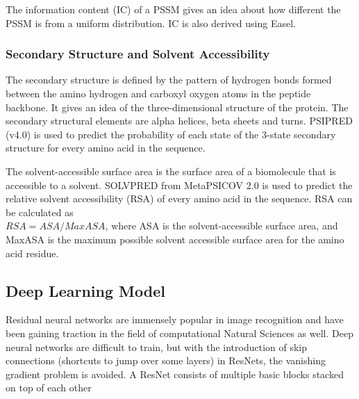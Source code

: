 \documentclass[journal=jacsat,manuscript=article]{achemso}
\begin{document}
The information content (IC) of a PSSM gives an idea about how different the PSSM is from a uniform distribution. IC is also derived using Easel.

\subsubsection{Secondary Structure and Solvent Accessibility}
\quad The secondary structure is defined by the pattern of hydrogen bonds formed between the amino hydrogen and carboxyl oxygen atoms in the peptide backbone. It gives an idea of the three-dimensional structure of the protein. The secondary structural elements are alpha helices, beta sheets and turns. PSIPRED (v4.0) \cite{jones1999protein} is used to predict the probability of each state of the 3-state secondary structure for every amino acid in the sequence.

The solvent-accessible surface area is the surface area of a biomolecule that is accessible to a solvent. SOLVPRED from MetaPSICOV 2.0\cite{jones2015metapsicov} is used to predict the relative solvent accessibility (RSA) of every amino acid in the sequence. RSA can be calculated as \\ ${RSA} = {ASA} / {MaxASA}$, where ASA is the solvent-accessible surface area, and MaxASA is the maximum possible solvent accessible surface area for the amino acid residue.





\subsection{Deep Learning Model}
\quad Residual neural networks \cite{he2016deep} are immensely popular in image recognition and have been gaining traction in the field of computational Natural Sciences as well. Deep neural networks are difficult to train, but with the introduction of skip connections (shortcuts to jump over some layers) in ResNets, the vanishing gradient problem is avoided. A ResNet consists of multiple basic blocks stacked on top of each other
\end{document}
